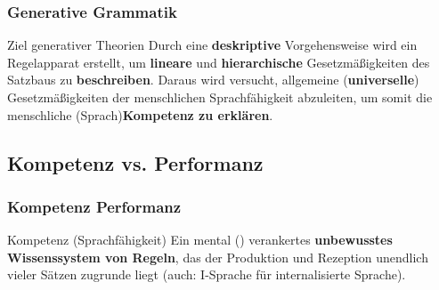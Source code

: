 \begin{frame}
\frametitle{Generative Grammatik}

\begin{block}{Ziel generativer Theorien}
Durch eine \textbf{deskriptive} Vorgehensweise wird ein Regelapparat erstellt, um \textbf{lineare} und \textbf{hierarchische} Gesetzmäßigkeiten des Satzbaus zu \textbf{beschreiben}. Daraus wird versucht, allgemeine (\textbf{universelle}) Gesetzmäßigkeiten der menschlichen Sprachfähigkeit abzuleiten, um somit die menschliche (Sprach)\textbf{Kompetenz zu erklären}.
\end{block}

\end{frame}


\subsection{Kompetenz vs. Performanz}


\begin{frame}
\frametitle{Kompetenz \vs Performanz}

\begin{block}{Kompetenz (Sprachfähigkeit)}
Ein mental () verankertes \textbf{unbewusstes Wissenssystem von Regeln}, das der Produktion und Rezeption unendlich vieler Sätzen zugrunde liegt (auch: I-Sprache für internalisierte Sprache). \citep[vgl.][]{Fries&MyP16d}
\end{block}	


\end{frame}


